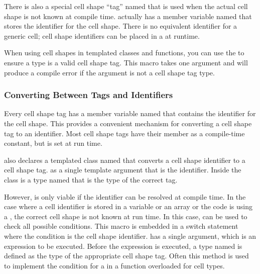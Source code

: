 There is also a special cell shape ``tag'' named 
that is used when the actual cell shape is not known at compile time.
 actually has a member variable named
 that stores the identifier for the cell shape. There is no
equivalent identifier for a generic cell; cell shape identifiers can be
placed in a  at runtime.

When using cell shapes in templated classes and functions, you can use the
 to ensure a type is a valid cell
shape tag. This macro takes one argument and will produce a compile error
if the argument is not a cell shape tag type.

\subsubsection{Converting Between Tags and Identifiers}

Every cell shape tag has a member variable named  that
contains the identifier for the cell shape. This provides a convenient
mechanism for converting a cell shape tag to an identifier. Most cell shape
tags have their  member as a compile-time constant, but
 is set at run time.

 also declares a templated class named
 that converts a cell shape identifier to a cell
shape tag.  as a single template argument
that is the identifier. Inside the class is a type named 
that is the type of the correct tag.


However,  is only viable if the identifier
can be resolved at compile time. In the case where a cell identifier is
stored in a variable or an array or the code is using a
, the correct cell shape is not known
at run time. In this case,  can be
used to check all possible conditions. This macro is embedded in a switch
statement where the condition is the cell shape identifier.
 has a single argument, which is an
expression to be executed. Before the expression is executed, a type named
 is defined as the type of the appropriate cell
shape tag. Often this method is used to implement the condition for a
 in a function overloaded for cell
types.

